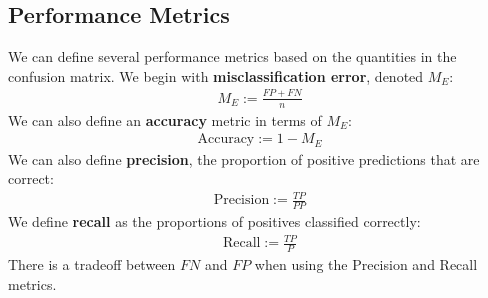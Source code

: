 \documentclass[12pt, a4paper]{article}
\theoremstyle{definition}
\begin{document}
	\subsection{Performance Metrics}
	We can define several performance metrics based on the quantities
	in the confusion matrix. We begin with \textbf{misclassification error},
	denoted $M_E$:
	\begin{align*}
		M_E := \frac{FP + FN}{n}
	\end{align*}
	We can also define an \textbf{accuracy} metric in terms of $M_E$:
	\begin{align*}
		\text{Accuracy} := 1 - M_E
	\end{align*}
	We can also define \textbf{precision}, the proportion of positive predictions
	that are correct:
	\begin{align*}
		\text{Precision} := \frac{TP}{PP}
	\end{align*}
	We define \textbf{recall} as the proportions of positives classified correctly:
	\begin{align*}
		\text{Recall} := \frac{TP}{P}
	\end{align*}
	There is a tradeoff between $FN$ and $FP$ when using the Precision and Recall
	metrics.
\end{document}
